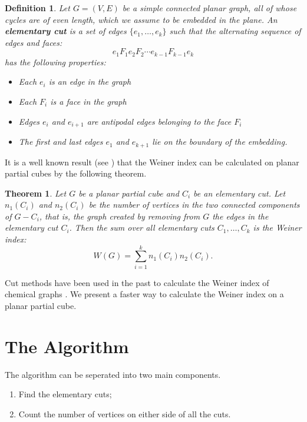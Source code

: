 \documentclass[11pt,a4paper]{article}
\newtheorem{theorem}{Theorem}
\newtheorem{definition}{Definition}
\begin{document}
\begin{definition}
Let $G=(V, E)$ be a simple connected planar graph, all of whose cycles are of even length, which we assume to be embedded in the plane.  An {\bf elementary cut} is a set of edges $\{e_1,\ldots,e_k\}$ such that the alternating sequence of edges and faces:
$$
e_1F_1e_2F_2 \cdots e_{k-1}F_{k-1}e_k
$$
has the following properties:
\begin{itemize}
\item Each $e_i$ is an edge in the graph
\item Each $F_i$ is a face in the graph
\item Edges $e_i$ and $e_{i+1}$ are antipodal edges belonging to the face $F_i$
\item The first and last edges $e_1$ and $e_{k+1}$ lie on the boundary of the embedding.
\end{itemize}
\end{definition}

It is a well known result (see \cite{K2015}) that the Weiner index can be calculated on planar partial cubes by the following theorem.

\begin{theorem}
Let $G$ be a planar partial cube and $C_i$ be an elementary cut. Let $n_1(C_i)$ and $n_2(C_i)$ be the number of vertices in the two connected components of $G-C_i$, that is, the graph created by removing from $G$ the edges in the elementary cut $C_i$. Then the sum over all elementary cuts $C_1,\ldots,C_k$ is the Weiner index: $$W(G)=\sum_{i=1}^kn_1(C_i)n_2(C_i).$$
\end{theorem}

Cut methods have been used in the past to calculate the Weiner index of chemical graphs \cite{K1997}. We present a faster way to calculate the Weiner index on a planar partial cube.

\section{The Algorithm} \label{sec:algorithm}

The algorithm can be seperated into two main components.

\begin{enumerate}
\item Find the elementary cuts;
\item Count the number of vertices on either side of all the cuts.
\end{enumerate}
\end{document}
